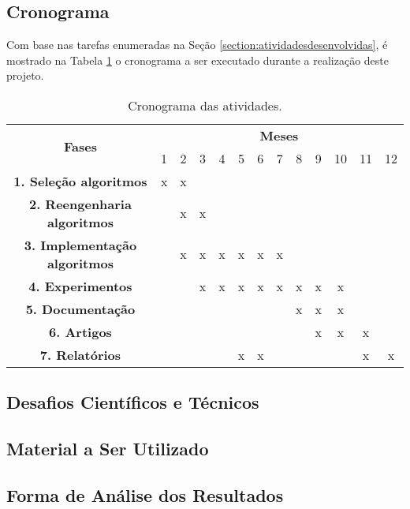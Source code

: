 \subsection{Cronograma}

Com base nas tarefas enumeradas na Seção \ref{section:atividadesdesenvolvidas}, é mostrado na Tabela \ref{tab:cronograma} o cronograma a ser executado durante a realização deste projeto.

\begin{table}[ht]
\centering
\caption{Cronograma das atividades.}
\begin{tabular}{|c|c|c|c|c|c|c|c|c|c|c|c|c|}
\hline
\multirow{2}{*}{{\bf Fases}} & \multicolumn{12}{c|}{{\bf Meses}}
\\ \cline{2-13}
    & 1 & 2 & 3 & 4 & 5 & 6 & 7 & 8 & 9 & 10 & 11 & 12
\\ \hline
    {\bf 1. Seleção algoritmos} & x & x & & & & & & & & & &
\\ \hline
    {\bf 2. Reengenharia algoritmos} &  & x & x & & & & & & & & &
\\ \hline
    {\bf 3. Implementação algoritmos} & & x & x & x & x & x & x & & & & &
\\ \hline
    {\bf 4. Experimentos} & & & x & x & x & x & x & x & x & x &  & 
\\ \hline
    {\bf 5. Documentação} & & & & & & & & x & x & x & & 
\\ \hline
    {\bf 6. Artigos} &  &  &  &  &  &  &  &  & x & x & x & 
\\ \hline    
    {\bf 7. Relatórios} & & & & & x & x & & & & & x & x
\\ \hline
\end{tabular}
\label{tab:cronograma}
\end{table}


\subsection{Desafios Científicos e Técnicos}


\subsection{Material a Ser Utilizado}
\label{section:material}

\subsection{Forma de Análise dos Resultados}
\label{section:analiseresultados}


